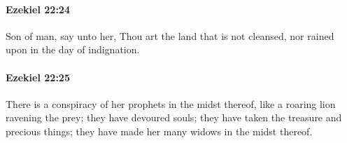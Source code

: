 		\paragraph{Ezekiel 22:24} %
			\label{EZEKIEL-22-24}

			Son of man, say unto her, Thou art the land that is not cleansed, nor rained upon in the day of indignation.


		\paragraph{Ezekiel 22:25} %
			\label{EZEKIEL-22-25}

			There is a conspiracy of her prophets in the midst thereof, like a roaring lion ravening the prey; they have devoured souls; they have taken the treasure and precious things; they have made her many widows in the midst thereof.


